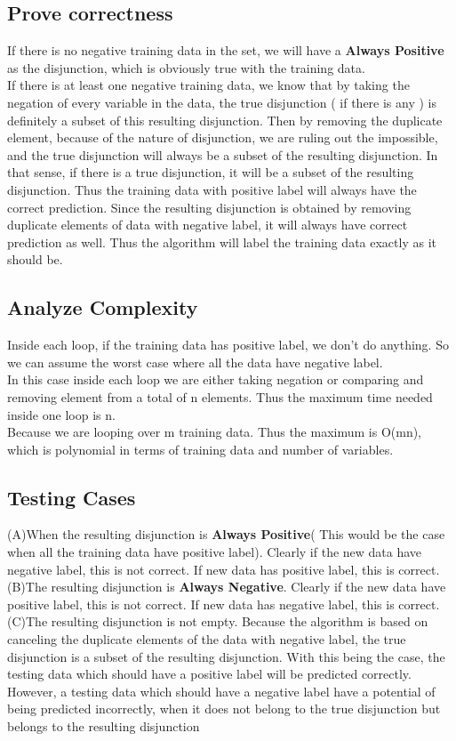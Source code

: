 \subsection{Prove correctness}
If there is no negative training data in the set, we will have a \textbf{Always Positive} as the disjunction, which is obviously true with the training data.
\\If there is at least one negative training data, we know that by taking the negation of every variable in the data, the true disjunction ( if there is any ) is definitely a subset of this resulting disjunction. Then by removing the duplicate element, because of the nature of disjunction, we are ruling out the impossible, and the true disjunction will always be a subset of the resulting disjunction. In that sense, if there is a true disjunction, it will be a subset of the resulting disjunction. Thus the training data with positive label will always have the correct prediction. Since the resulting disjunction is obtained by removing duplicate elements of data with negative label, it will always have correct prediction as well. Thus the algorithm will label the training data exactly as it should be.   

\subsection{Analyze Complexity}
Inside each loop, if the training data has positive label, we don't do anything. So we can assume the worst case where all the data have negative label. 
\\In this case inside each loop we are either taking negation or comparing and removing element from a total of n elements. Thus the maximum time needed inside one loop is n. 
\\Because we are looping over m training data. Thus the maximum is O(mn), which is polynomial in terms of training data and number of variables. 

\subsection{Testing Cases}
(A)When the resulting disjunction is \textbf{Always Positive}( This would be the case when all the training data have positive label). Clearly if the new data have negative label, this is not correct. If new data has positive label, this is correct.
\\(B)The resulting disjunction is \textbf{Always Negative}. Clearly if the new data have positive label, this is not correct. If new data has negative label, this is correct.
\\(C)The resulting disjunction is not empty. Because the algorithm is based on canceling the duplicate elements of the data with negative label, the true disjunction is a subset of the resulting disjunction. With this being the case, the testing data which should have a positive label will be predicted correctly. However, a testing data which should have a negative label have a potential of being predicted incorrectly, when it does not belong to the true disjunction but belongs to the resulting disjunction

